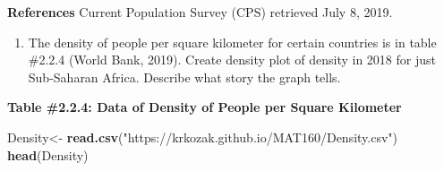 \documentclass[]{book}
\newenvironment{Shaded}{\begin{snugshade}}{\end{snugshade}}
\newcommand{\KeywordTok}[1]{\textcolor[rgb]{0.13,0.29,0.53}{\textbf{#1}}}
\newcommand{\NormalTok}[1]{#1}
\newcommand{\StringTok}[1]{\textcolor[rgb]{0.31,0.60,0.02}{#1}}
\providecommand{\tightlist}{%
  \setlength{\itemsep}{0pt}\setlength{\parskip}{0pt}}
\begin{document}
\textbf{References}
Current Population Survey (CPS) retrieved July 8, 2019.

\begin{enumerate}
\def\labelenumi{\arabic{enumi}.}
\setcounter{enumi}{1}
\tightlist
\item
  The density of people per square kilometer for certain countries is in table \#2.2.4 (World Bank, 2019). Create density plot of density in 2018 for just Sub-Saharan Africa. Describe what story the graph tells.
\end{enumerate}

\textbf{Table \#2.2.4: Data of Density of People per Square Kilometer}

\begin{Shaded}
\begin{Highlighting}[]
\NormalTok{Density<-}\StringTok{ }\KeywordTok{read.csv}\NormalTok{(}\StringTok{"https://krkozak.github.io/MAT160/Density.csv"}\NormalTok{) }
\KeywordTok{head}\NormalTok{(Density)}
\end{Highlighting}
\end{Shaded}
\end{document}
